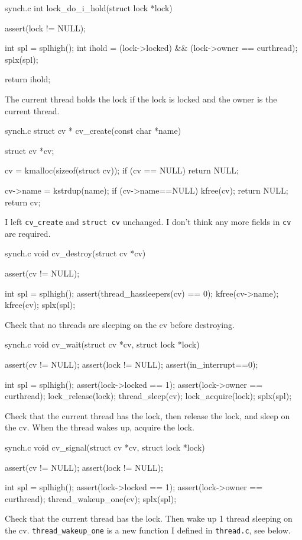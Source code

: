 \documentclass[10pt]{article}
\begin{document}
\begin{codefile}{synch.c}
int
lock_do_i_hold(struct lock *lock)
{
    assert(lock != NULL);

    int spl = splhigh();
    int ihold = (lock->locked) && (lock->owner == curthread);
    splx(spl);

    return ihold;
}
\end{codefile}
The current thread holds the lock if the lock is locked and the owner is the current thread.\\


\begin{codefile}{synch.c}
struct cv *
cv_create(const char *name)
{
    struct cv *cv;

    cv = kmalloc(sizeof(struct cv));
    if (cv == NULL) {
        return NULL;
    }

    cv->name = kstrdup(name);
    if (cv->name==NULL) {
        kfree(cv);
        return NULL;
    }
    return cv;
}
\end{codefile}
I left \verb|cv_create| and \verb|struct cv| unchanged. I don't think any more fields in \verb|cv| are
required.\\


\begin{codefile}{synch.c}
void
cv_destroy(struct cv *cv)
{
    assert(cv != NULL);

    int spl = splhigh();
    assert(thread_hassleepers(cv) == 0);
    kfree(cv->name);
    kfree(cv);
    splx(spl);
}
\end{codefile}
Check that no threads are sleeping on the cv before destroying.\\


\begin{codefile}{synch.c}
void
cv_wait(struct cv *cv, struct lock *lock)
{
    assert(cv != NULL);
    assert(lock != NULL);
    assert(in_interrupt==0);

    int spl = splhigh();
    assert(lock->locked == 1);
    assert(lock->owner == curthread);
    lock_release(lock);
    thread_sleep(cv);
    lock_acquire(lock);
    splx(spl);
}
\end{codefile}
Check that the current thread has the lock, then release the lock, and sleep on the cv.
When the thread wakes up, acquire the lock.\\


\begin{codefile}{synch.c}
void
cv_signal(struct cv *cv, struct lock *lock)
{
    assert(cv != NULL);
    assert(lock != NULL);

    int spl = splhigh();
    assert(lock->locked == 1);
    assert(lock->owner == curthread);
    thread_wakeup_one(cv);
    splx(spl);
}
\end{codefile}
Check that the current thread has the lock. Then wake up 1 thread sleeping on the cv.
\verb|thread_wakeup_one| is a new function I defined in \verb|thread.c|, see below.\\
\end{document}
